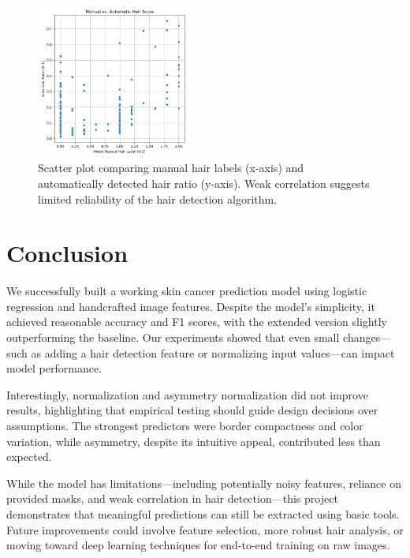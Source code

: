 \documentclass[10pt,twocolumn]{article}
\begin{document}
\begin{figure}[htbp]
\centering
\includegraphics[width=0.45\textwidth]{hair_validation_scatter.png}
\caption{Scatter plot comparing manual hair labels (x-axis) and automatically detected hair ratio (y-axis). Weak correlation suggests limited reliability of the hair detection algorithm.}
\label{fig:hair_validation_scatter}
\end{figure}


\section{Conclusion}
We successfully built a working skin cancer prediction model using logistic regression and handcrafted image features. Despite the model’s simplicity, it achieved reasonable accuracy and F1 scores, with the extended version slightly outperforming the baseline. Our experiments showed that even small changes—such as adding a hair detection feature or normalizing input values—can impact model performance.

Interestingly, normalization and asymmetry normalization did not improve results, highlighting that empirical testing should guide design decisions over assumptions. The strongest predictors were border compactness and color variation, while asymmetry, despite its intuitive appeal, contributed less than expected.

While the model has limitations—including potentially noisy features, reliance on provided masks, and weak correlation in hair detection—this project demonstrates that meaningful predictions can still be extracted using basic tools. Future improvements could involve feature selection, more robust hair analysis, or moving toward deep learning techniques for end-to-end training on raw images.
\end{document}
